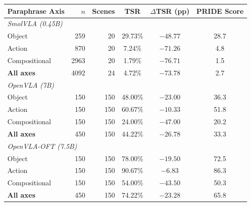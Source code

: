 \begin{tabular}{lrrccc}
\toprule
\textbf{Paraphrase Axis} & \textbf{$n$} & \textbf{Scenes} & \textbf{TSR} & \textbf{$\Delta$TSR (pp)} & \textbf{PRIDE Score} \\
\midrule
\multicolumn{6}{l}{\textit{SmolVLA (0.45B)}} \\
Object & 259 & 20 & 29.73\% & $-48.77$ & 28.7 \\
Action & 870 & 20 & 7.24\% & $-71.26$ & 4.8 \\
Compositional & 2963 & 20 & 1.79\% & $-76.71$ & 1.5 \\
\textbf{All axes} & 4092 & 24 & 4.72\% & $-73.78$ & 2.7 \\
\midrule
\multicolumn{6}{l}{\textit{OpenVLA (7B)}} \\
Object & 150 & 150 & 48.00\% & $-23.00$ & 36.3 \\
Action & 150 & 150 & 60.67\% & $-10.33$ & 51.8 \\
Compositional & 150 & 150 & 24.00\% & $-47.00$ & 20.2 \\
\textbf{All axes} & 450 & 150 & 44.22\% & $-26.78$ & 33.3 \\
\midrule
\multicolumn{6}{l}{\textit{OpenVLA-OFT (7.5B)}} \\
Object & 150 & 150 & 78.00\% & $-19.50$ & 72.5 \\
Action & 150 & 150 & 90.67\% & $-6.83$ & 86.3 \\
Compositional & 150 & 150 & 54.00\% & $-43.50$ & 50.3 \\
\textbf{All axes} & 450 & 150 & 74.22\% & $-23.28$ & 65.8 \\
\bottomrule
\end{tabular}

